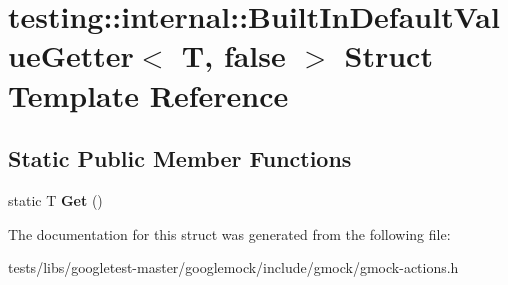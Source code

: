 \hypertarget{structtesting_1_1internal_1_1BuiltInDefaultValueGetter_3_01T_00_01false_01_4}{}\section{testing\+:\+:internal\+:\+:Built\+In\+Default\+Value\+Getter$<$ T, false $>$ Struct Template Reference}
\label{structtesting_1_1internal_1_1BuiltInDefaultValueGetter_3_01T_00_01false_01_4}
\subsection*{Static Public Member Functions}
\begin{DoxyCompactItemize}
\item 
\mbox{\label{structtesting_1_1internal_1_1BuiltInDefaultValueGetter_3_01T_00_01false_01_4_a8c8e929666f61272961eea21a60de4ad}} 
static T {\bfseries Get} ()
\end{DoxyCompactItemize}


The documentation for this struct was generated from the following file\+:\begin{DoxyCompactItemize}
\item 
tests/libs/googletest-\/master/googlemock/include/gmock/gmock-\/actions.\+h\end{DoxyCompactItemize}
